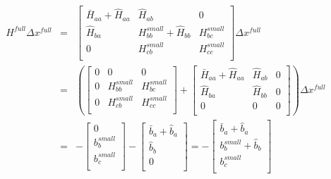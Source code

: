 \documentclass[letterpaper,10pt]{article}
\begin{document}
\begin{equation}
\begin{array}{rcl}
H^{full} \Delta x^{full} & = & \left[\begin{array}{ccc}
\bar{H}_{aa} + \hat{H}_{aa} & \hat{H}_{ab} & 0 \\
\hat{H}_{ba} & H_{bb}^{small} + \hat{H}_{bb} & H_{bc}^{small} \\
0 & H_{cb}^{small} & H_{cc}^{small} \\
\end{array}\right] \Delta x^{full} \\

& = & \left(\left[\begin{array}{ccc}
0 & 0 & 0 \\
0 & H_{bb}^{small} & H_{bc}^{small} \\
0 & H_{cb}^{small} & H_{cc}^{small} \\
\end{array}\right]+\left[\begin{array}{ccc}
\bar{H}_{aa} + \hat{H}_{aa} & \hat{H}_{ab} & 0 \\
\hat{H}_{ba} & \hat{H}_{bb} & 0 \\
0 & 0 & 0 \\
\end{array}\right]\right) \Delta x^{full} \\

& = & -\left[\begin{array}{c}
0 \\
b_b^{small} \\
b_c^{small} \\
\end{array}\right] - \left[\begin{array}{c}
\bar{b}_a+\hat{b}_a \\
\hat{b}_b \\
0 \\
\end{array}\right] = -\left[\begin{array}{c}
\bar{b}_a + \hat{b}_a \\
b_b^{small} + \hat{b}_b \\
b_c^{small} \\
\end{array}\right]\\ 
\end{array}
\end{equation}
\end{document}
